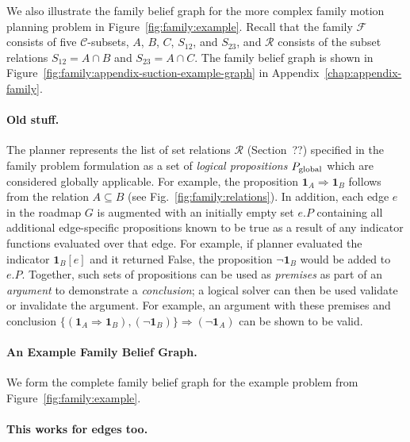 We also illustrate the family belief graph
for the more complex family motion planning
problem in Figure~\ref{fig:family:example}.
Recall that the family $\mathcal{F}$ consists of
five $\mathcal{C}$-subsets, $A$, $B$, $C$, $S_{12}$, and $S_{23}$,
and $\mathcal{R}$ consists of the subset relations
$S_{12} = A \cap B$ and $S_{23} = A \cap C$.
The family belief graph is shown
in Figure~\ref{fig:family:appendix-suction-example-graph}
in Appendix~\ref{chap:appendix-family}.

\vspace{1in}

\paragraph{Old stuff.}
The planner represents the list of set relations $\mathcal{R}$
(Section~??)
specified in the family problem formulation
as a set of \emph{logical propositions} $P_{\mbox{\scriptsize global}}$
which are considered globally applicable.
For example,
the proposition $\mathbf{1}_A \Rightarrow \mathbf{1}_B$
follows from the relation $A \subseteq B$
(see Fig.~\ref{fig:family:relations}).
In addition,
each edge $e$ in the roadmap $G$ is augmented with an initially empty
set $e.P$ containing all additional edge-specific propositions
known to be true as a result of any indicator functions evaluated
over that edge.
For example,
if planner evaluated the indicator $\mathbf{1}_B[e]$
and it returned False,
the proposition $\lnot\mathbf{1}_B$ would be added to $e.P$.
Together, such sets of propositions can be used as \emph{premises}
as part of an \emph{argument} to demonstrate a \emph{conclusion};
a logical solver can then be used validate or invalidate the argument.
For example, an argument with these premises and conclusion
$\{ (\mathbf{1}_A \Rightarrow \mathbf{1}_B), (\lnot\mathbf{1}_B) \}
\Rightarrow (\lnot\mathbf{1}_A)$
can be shown to be valid.




\paragraph{An Example Family Belief Graph.}
We form the complete family belief graph for the example problem
from Figure~\ref{fig:family:example}.

\paragraph{This works for edges too.}

